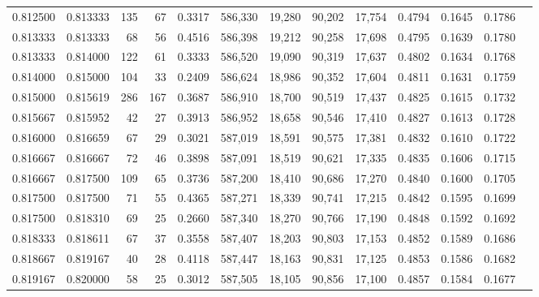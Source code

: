 \begin{tabular}{rrrrrrrrrrrrr}
0.812500 & 0.813333 &   135 &  67 &                                     0.3317 & 586,330 &  19,280 &  90,202 &  17,754 & 0.4794 & 0.1645 & 0.1786 \\
0.813333 & 0.813333 &    68 &  56 &                                     0.4516 & 586,398 &  19,212 &  90,258 &  17,698 & 0.4795 & 0.1639 & 0.1780 \\
0.813333 & 0.814000 &   122 &  61 &                                     0.3333 & 586,520 &  19,090 &  90,319 &  17,637 & 0.4802 & 0.1634 & 0.1768 \\
0.814000 & 0.815000 &   104 &  33 &                                     0.2409 & 586,624 &  18,986 &  90,352 &  17,604 & 0.4811 & 0.1631 & 0.1759 \\
0.815000 & 0.815619 &   286 & 167 &                                     0.3687 & 586,910 &  18,700 &  90,519 &  17,437 & 0.4825 & 0.1615 & 0.1732 \\
0.815667 & 0.815952 &    42 &  27 &                                     0.3913 & 586,952 &  18,658 &  90,546 &  17,410 & 0.4827 & 0.1613 & 0.1728 \\
0.816000 & 0.816659 &    67 &  29 &                                     0.3021 & 587,019 &  18,591 &  90,575 &  17,381 & 0.4832 & 0.1610 & 0.1722 \\
0.816667 & 0.816667 &    72 &  46 &                                     0.3898 & 587,091 &  18,519 &  90,621 &  17,335 & 0.4835 & 0.1606 & 0.1715 \\
0.816667 & 0.817500 &   109 &  65 &                                     0.3736 & 587,200 &  18,410 &  90,686 &  17,270 & 0.4840 & 0.1600 & 0.1705 \\
0.817500 & 0.817500 &    71 &  55 &                                     0.4365 & 587,271 &  18,339 &  90,741 &  17,215 & 0.4842 & 0.1595 & 0.1699 \\
0.817500 & 0.818310 &    69 &  25 &                                     0.2660 & 587,340 &  18,270 &  90,766 &  17,190 & 0.4848 & 0.1592 & 0.1692 \\
0.818333 & 0.818611 &    67 &  37 &                                     0.3558 & 587,407 &  18,203 &  90,803 &  17,153 & 0.4852 & 0.1589 & 0.1686 \\
0.818667 & 0.819167 &    40 &  28 &                                     0.4118 & 587,447 &  18,163 &  90,831 &  17,125 & 0.4853 & 0.1586 & 0.1682 \\
0.819167 & 0.820000 &    58 &  25 &                                     0.3012 & 587,505 &  18,105 &  90,856 &  17,100 & 0.4857 & 0.1584 & 0.1677 \\

\end{tabular}
